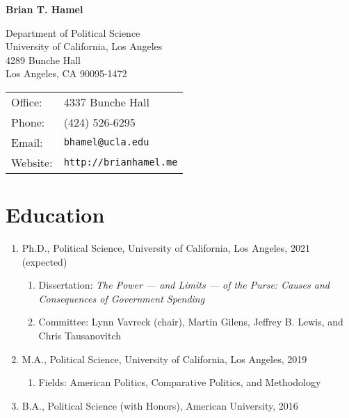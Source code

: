 \documentclass[12pt]{article}
\def\name{\textbf{Brian T. Hamel}}
\begin{document}
{\huge \name}


\vspace{0.25in}

\begin{minipage}{0.5\linewidth}
  Department of Political Science \\
  University of California, Los Angeles \\
  4289 Bunche Hall \\
  Los Angeles, CA 90095-1472 
\end{minipage}
\begin{minipage}{0.5\linewidth}
  \begin{tabular}{ll}
    Office: & 4337 Bunche Hall \\
    Phone: & (424) 526-6295 \\
    Email: & \texttt{bhamel@ucla.edu} \\
    Website: & \texttt{http://brianhamel.me} \\
  \end{tabular}
\end{minipage}

\section*{Education}

\begin{enumerate}[topsep = 0pt, itemsep = 1ex, partopsep  = 1ex, parsep = 1ex]

	\item[] Ph.D., Political Science, University of California, Los Angeles, 2021 (expected)
		
	\begin{enumerate}[topsep = 0pt, itemsep = -1ex, partopsep = -1ex, parsep = 1ex]
	
		\item[] Dissertation: \textit{The Power --- and Limits --- of the Purse: Causes and Consequences of Government Spending}
		
		\item[] Committee: Lynn Vavreck (chair), Martin Gilens, Jeffrey B. Lewis, and Chris Tausanovitch
	
	\end{enumerate}
		
	\item[] M.A., Political Science, University of California, Los Angeles, 2019
	
	\begin{enumerate}[topsep = 0pt, itemsep = -1ex, partopsep  = -1ex, parsep = 1ex]
	
		\item[] Fields: American Politics, Comparative Politics, and Methodology
	
	\end{enumerate}
		
	\item[] B.A., Political Science (with Honors), American University, 2016

\end{enumerate}
\end{document}
